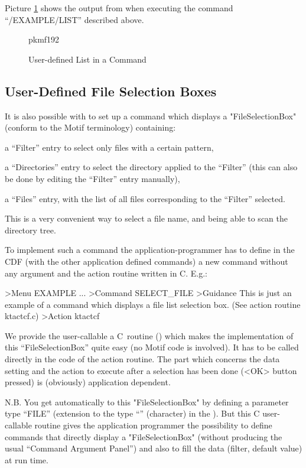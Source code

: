 Picture \ref{ref:FIGPKMF192} shows the output from
\KUIPMotif{} when executing the command ``/EXAMPLE/LIST'' described above.

\begin{figure}[htb]
\hfill
\begin{PICTf}[.4]{pkmf192}
\end{PICTf}
\hfill
\caption{User-defined List in a Command}
\label{ref:FIGPKMF192}
\end{figure}
 
\subsection{User-Defined File Selection Boxes}
 
It is also possible with \KUIPMotif{} to set up a command which displays a
"FileSelectionBox" (conform to the Motif terminology) containing:
\begin{UL}
\item
a ``Filter'' entry to select only files with a certain pattern,
\item
a ``Directories'' entry to select the directory applied to the ``Filter''
(this can also be done by editing the ``Filter'' entry manually),
\item
a ``Files'' entry, with the list of all files corresponding to the
``Filter'' selected.
\end{UL}
This is a very convenient way to select a file name, and being able to
scan the directory tree.
 
To implement such a command the application-programmer has to define
in the CDF (with the other application defined commands) a new command
without any argument and the action routine written in C. E.g.:
\begin{XMP}
>Menu EXAMPLE
...
>Command SELECT_FILE
>Guidance
This is just an example of a command which
displays a file list selection box.
(See action routine ktactcf.c)
>Action ktactcf%
\end{XMP}
We provide the user-callable a C~routine ()
which makes the implementation of this ``FileSelectionBox''
quite easy (no Motif code is involved). It has to be called
directly in the code of the action routine. The part which concerns the
data setting and the action to execute after a selection has been
done (<OK> button pressed) is (obviously) application dependent.
 
N.B. You get automatically to this "FileSelectionBox" by defining a
parameter type ``FILE'' (extension to the type ``'' (character) in the
\CDF{}). But this C user-callable routine
gives the application programmer the
possibility to define commands that directly display a
"FileSelectionBox" (without producing the usual ``Command Argument Panel'')
and also to fill the data (filter, default value) at run time.
 
